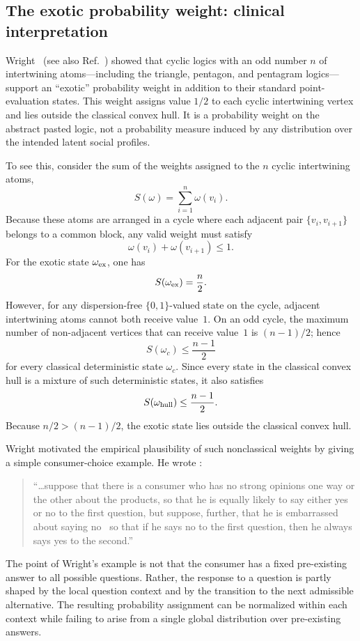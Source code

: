 \documentclass[aps,pra,twocolumn,superscriptaddress,floatfix,longbibliography]{revtex4-2}
\begin{document}
\subsection{The exotic probability weight: clinical interpretation}
\label{2026-pliss:exoticProbs}

Wright~\cite{wright:pent} (see also Ref.~\cite[Fig.~V]
{greechie-1974}) showed that cyclic logics with an odd number \(n\)
of intertwining atoms---including the triangle, pentagon, and
pentagram logics---support an ``exotic'' probability weight in
addition to their standard point-evaluation states. This weight
assigns value \(1/2\) to each cyclic intertwining vertex and lies
outside the classical convex hull. It is a probability weight on the
abstract pasted logic, not a probability measure induced by any
distribution over the intended latent social profiles.

To see this, consider the sum of the weights assigned to the \(n\)
cyclic intertwining atoms,
\[
S(\omega)=\sum_{i=1}^n\omega(v_i).
\]
Because these atoms are arranged in a cycle where each adjacent pair
\(\{v_i,v_{i+1}\}\) belongs to a common block, any valid weight must
satisfy
\[
\omega(v_i)+\omega(v_{i+1})\leq 1.
\]
For the exotic state \(\omega_{\rm ex}\), one has
\[
S(\omega_{\rm ex})=\frac n2.
\]
However, for any dispersion-free \(\{0,1\}\)-valued state on the
cycle, adjacent intertwining atoms cannot both receive value~\(1\).
On an odd cycle, the maximum number of non-adjacent vertices that can
receive value~\(1\) is \((n-1)/2\); hence
\[
S(\omega_c)\leq \frac{n-1}{2}
\]
for every classical deterministic state \(\omega_c\). Since every
state in the classical convex hull is a mixture of such deterministic
states, it also satisfies
\[
S(\omega_{\rm hull})\leq \frac{n-1}{2}.
\]
Because \(n/2>(n-1)/2\), the exotic state lies outside the classical
convex hull.

Wright motivated the empirical plausibility of such nonclassical
weights by giving a simple consumer-choice example. He wrote
\cite[p.~272]{wright:pent}:
\begin{quote}
``\dots suppose that there is a consumer who
has no strong opinions one way or the other about the products, so that
he is equally likely to say either yes or no to the first question, but
suppose, further, that he is embarrassed about saying no~\cite{smith1975} so that
if he says no to the first question, then he always says yes to the
second.''
\end{quote}
The point of Wright's example is not that the consumer has a fixed
pre-existing answer to all possible questions. Rather, the response
to a question is partly shaped by the local question context and by
the transition to the next admissible alternative. The resulting
probability assignment can be normalized within each context while
failing to arise from a single global distribution over pre-existing
answers.
\end{document}
